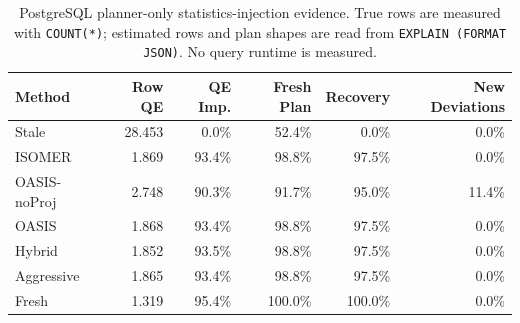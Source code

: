 \begin{table}[t]
  \centering
  \small
  \caption{PostgreSQL planner-only statistics-injection evidence. True rows are measured with \texttt{COUNT(*)}; estimated rows and plan shapes are read from \texttt{EXPLAIN (FORMAT JSON)}. No query runtime is measured.}
  \label{tab:postgres_planner_stats_injection}
  \setlength{\tabcolsep}{4pt}
  \begin{tabular}{lrrrrr}
    \toprule
    Method & Row QE & QE Imp. & Fresh Plan & Recovery & New Deviations \\
    \midrule
    Stale & 28.453 & 0.0\% & 52.4\% & 0.0\% & 0.0\% \\
    ISOMER & 1.869 & 93.4\% & 98.8\% & 97.5\% & 0.0\% \\
    OASIS-noProj & 2.748 & 90.3\% & 91.7\% & 95.0\% & 11.4\% \\
    OASIS & 1.868 & 93.4\% & 98.8\% & 97.5\% & 0.0\% \\
    Hybrid & 1.852 & 93.5\% & 98.8\% & 97.5\% & 0.0\% \\
    Aggressive & 1.865 & 93.4\% & 98.8\% & 97.5\% & 0.0\% \\
    Fresh & 1.319 & 95.4\% & 100.0\% & 100.0\% & 0.0\% \\
    \bottomrule
  \end{tabular}
\end{table}
